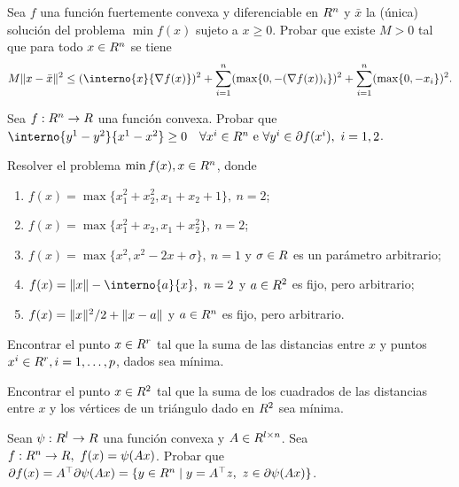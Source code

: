 \begin{exercise}\label{v1:ejer:3.4.28}
 Sea $f$ una función fuertemente convexa y diferenciable en $R^n$ y $\bar{x}$ la (única) solución del problema $\min f(x)$ sujeto a $x \ge 0$. Probar que existe $M > 0$ tal que para todo $x \in R^n$ se tiene
 \[
 M \norm{x - \bar{x}}^2 \le (\interno{x}{\nabla f(x)})^2 + \sum_{i=1}^n (\max\{0, -(\nabla f(x))_i\})^2 + \sum_{i=1}^n (\max\{0, -x_i\})^2.
 \]
\end{exercise}

\begin{exercise}\label{v1:ejer:3.4.29}
 Sea $f: R^n \to R$ una función convexa. Probar que $\interno{y^1 - y^2}{x^1 - x^2} \ge 0 \quad \forall x^i \in \Rn \text{ e } \forall y^i \in \partial f(x^i), \ i = 1, 2$.
\end{exercise}

\begin{exercise}\label{v1:ejer:3.4.30}
 Resolver el problema $\min f(x), x \in R^n$, donde
 \begin{enumerate}[label=(\alph*)]
  \item $f(x) = \max\{x_1^2 + x_2^2, x_1 + x_2 + 1\}, \ n = 2$;
  \item $f(x) = \max\{x_1^2 + x_2, x_1 + x_2^2\}, \ n = 2$;
  \item $f(x) = \max\{x^2, x^2 - 2x + \sigma\}, \ n = 1$ y $\sigma \in R$ es un parámetro arbitrario;
  \item $f(x) = \norm{x} - \interno{a}{x}, \ n = 2$ y $a \in R^2$ es fijo, pero arbitrario;
  \item $f(x) = \lVert x\rVert^2 / 2 + \lVert x - a\rVert$ y $a \in R^n$ es fijo, pero arbitrario.
 \end{enumerate}
\end{exercise}

\begin{exercise}\label{v1:ejer:3.4.31}
 Encontrar el punto $x \in R^r$ tal que la suma de las distancias entre $x$ y puntos $x^i \in R^r, i=1,\dots,p$, dados sea mínima.
\end{exercise}

\begin{exercise}\label{v1:ejer:3.4.32}
 Encontrar el punto $x \in R^2$ tal que la suma de los cuadrados de las distancias entre $x$ y los vértices de un triángulo dado en $R^2$ sea mínima.
\end{exercise}

\begin{exercise}\label{v1:ejer:3.4.33}
 Sean $\psi: R^l \to R$ una función convexa y $A \in R^{l \times n}$. Sea $f: R^n \to R, \ f(x) = \psi(Ax)$. Probar que $\partial f(x) = A^\top \partial \psi(Ax) = \{ y \in R^n \mid y = A^\top z, \ z \in \partial \psi(Ax) \}$.
\end{exercise}

